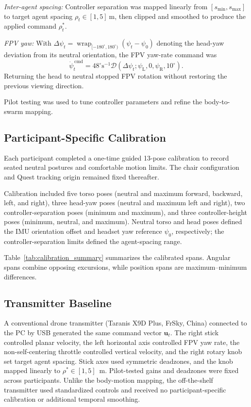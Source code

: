 \documentclass[a4paper,10pt,conference]{ieeeconf}
\begin{document}

\emph{Inter-agent spacing:}
Controller separation was mapped linearly from $[s_{\min},s_{\max}]$ to target
agent spacing $\rho_t\in[1,5]~\mathrm{m}$, then clipped and smoothed to produce
the applied command $\rho_t^*$.

\emph{FPV yaw:}
With
$\Delta\psi_t=
\operatorname{wrap}_{[-180^{\circ},180^{\circ})}
(\psi_t-\psi_{0})$
denoting the head-yaw deviation from its neutral orientation, the FPV yaw-rate
command was
\begin{equation}
\dot{\psi}^{\,\mathrm{cmd}}_t
=
48^{\circ}\mathrm{s}^{-1}
\mathcal{D}\!\left(
\Delta\psi_t;\psi_{\mathrm{L}},0,\psi_{\mathrm{R}},10^{\circ}
\right).
\label{eq:yaw_rate}
\end{equation}
Returning the head to neutral stopped FPV rotation without restoring the
previous viewing direction.

Pilot testing was used to tune controller parameters and refine the
body-to-swarm mapping.

\subsection{Participant-Specific Calibration}
\label{sec:calibration}
Each participant completed a one-time guided 13-pose calibration to record
seated neutral postures and comfortable motion limits. The chair configuration and Quest tracking origin remained fixed thereafter.

Calibration included five torso poses (neutral and maximum forward, backward,
left, and right), three head-yaw poses (neutral and maximum left and right),
two controller-separation poses (minimum and maximum), and three
controller-height poses (minimum, neutral, and maximum). Neutral torso and head poses defined the IMU orientation offset and headset yaw
reference $\psi_0$, respectively; the controller-separation limits defined the
agent-spacing range.

Table~\ref{tab:calibration_summary} summarizes the calibrated spans. Angular
spans combine opposing excursions, while position spans are
maximum--minimum differences.

\subsection{Transmitter Baseline}
\label{sec:transmitter}
A conventional drone transmitter (Taranis X9D Plus, FrSky, China) connected to
the PC by USB generated the same command vector $\mathbf{u}_t$. The right stick
controlled planar velocity, the left horizontal axis controlled FPV yaw rate,
the non-self-centering throttle controlled vertical velocity, and the right
rotary knob set target agent spacing. Stick axes used symmetric deadzones, and
the knob mapped linearly to $\rho^*\in[1,5]$~m. Pilot-tested gains and deadzones were fixed across participants. Unlike the body-motion mapping, the off-the-shelf transmitter used standardized controls and received no participant-specific calibration or additional temporal
smoothing.
\end{document}
